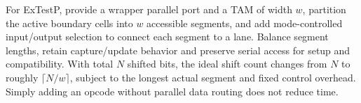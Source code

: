 \documentclass[11pt]{article}
\begin{document}
For ExTestP, provide a wrapper parallel port and a TAM of width $w$,
partition the active boundary cells into $w$ accessible segments, and add
mode-controlled input/output selection to connect each segment to a lane.
Balance segment lengths, retain capture/update behavior and preserve serial
access for setup and compatibility. With total $N$ shifted bits, the ideal
shift count changes from $N$ to roughly $\lceil N/w\rceil$, subject to the
longest actual segment and fixed control overhead. Simply adding an opcode
without parallel data routing does not reduce time.
\end{document}
